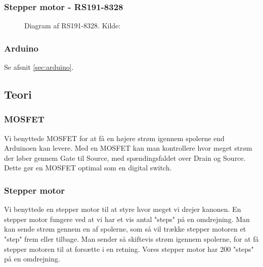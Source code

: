 \subsubsection{Stepper motor - RS191-8328}
\begin{figure}[H]
	\centering
	\caption{Diagram af RS191-8328. Kilde: \cite{stepmotor}}
	    \label{fig:kompstepper}
\end{figure}


\subsubsection{Arduino}
Se afsnit \ref{sec:arduino}.

\subsection{Teori}
\subsubsection{MOSFET}
Vi benyttede MOSFET for at få en højere strøm igennem spolerne end Arduinoen kan levere. Med en MOSFET kan man kontrollere hvor meget strøm der løber gennem Gate til Source, med spændingsfaldet over Drain og Source. Dette gør en MOSFET optimal som en digital switch. 
\subsubsection{Stepper motor}
Vi benyttede en stepper motor til at styre hvor meget vi drejer kanonen. En stepper motor fungere ved at vi har et vis antal "steps" på en omdrejning. Man kan sende strøm gennem en af spolerne, som så vil trække stepper motoren et "step" frem eller tilbage. Man sender så skiftevis strøm igennem spolerne, for at få stepper motoren til at forsætte i en retning. Vores stepper motor har 200 "steps" på en omdrejning. 

